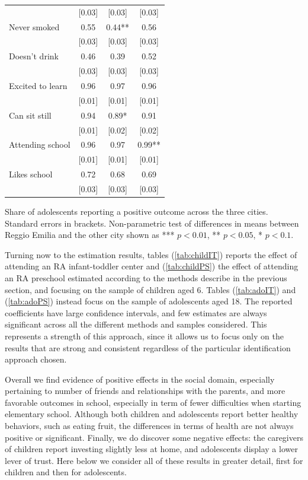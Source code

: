\documentclass[12pt]{article}
\begin{document}
\begin{table}[ht]
\begin{center}
\begin{tabular}{lccc}
          & [0.03] & [0.03] & [0.03] \\
    Never smoked & 0.55  & 0.44** & 0.56 \\
          & [0.03] & [0.03] & [0.03] \\
    Doesn't drink & 0.46  & 0.39  & 0.52 \\
          & [0.03] & [0.03] & [0.03] \\
    Excited to learn & 0.96  & 0.97  & 0.96 \\
          & [0.01] & [0.01] & [0.01] \\
    Can sit still & 0.94  & 0.89* & 0.91 \\
          & [0.01] & [0.02] & [0.02] \\
    Attending school & 0.96  & 0.97  & 0.99** \\
          & [0.01] & [0.01] & [0.01] \\
    Likes school & 0.72  & 0.68  & 0.69 \\
          & [0.03] & [0.03] & [0.03] \\

    \hline	
    \end{tabular}
\end{center}

\begin{footnotesize}
\raggedright{Share of adolescents reporting a positive outcome across the three cities. Standard errors in brackets.
Non-parametric test of differences in means between Reggio Emilia and the other city shown as *** $p<0.01$, ** $p<0.05$, * $p<0.1$.}
\end{footnotesize}
\end{table}

Turning now to the estimation results, tables (\ref{tab:childIT}) reports the effect of attending an RA infant-toddler center and (\ref{tab:childPS}) the effect of attending an RA preschool estimated according to the methods describe in the previous section, and focusing on the sample of children aged 6. Tables (\ref{tab:adoIT}) and (\ref{tab:adoPS}) instead focus on the sample of adolescents aged 18.
The reported coefficients have large confidence intervals, and few estimates are always significant across all the different methods and samples considered. This represents a strength of this approach, since it allows us to focus only on the results that are strong and consistent regardless of the particular identification approach chosen.

Overall we find evidence of positive effects in the social domain, especially pertaining to number of friends and relationships with the parents, and more favorable outcomes in school, especially in term of fewer difficulties when starting elementary school. Although both children and adolescents report better healthy behaviors, such as eating fruit, the differences in terms of health are not always positive or significant. Finally, we do discover some negative effects: the caregivers of children report investing slightly less at home, and adolescents display a lower lever of trust. Here below we consider all of these results in greater detail, first for children and then for adolescents.
\end{document}
